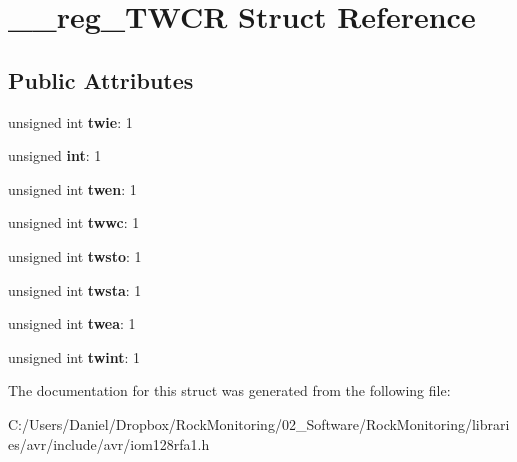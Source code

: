 \hypertarget{struct____reg___t_w_c_r}{}\section{\+\_\+\+\_\+reg\+\_\+\+T\+W\+CR Struct Reference}
\label{struct____reg___t_w_c_r}
\subsection*{Public Attributes}
\begin{DoxyCompactItemize}
\item 
unsigned int {\bfseries twie}\+: 1\hypertarget{struct____reg___t_w_c_r_a1f4dfd77061f0fb4a3e2cc3dc9882371}{}\label{struct____reg___t_w_c_r_a1f4dfd77061f0fb4a3e2cc3dc9882371}

\item 
unsigned {\bfseries int}\+: 1\hypertarget{struct____reg___t_w_c_r_a723570c3f1619cb053e5e4f7cf4b173a}{}\label{struct____reg___t_w_c_r_a723570c3f1619cb053e5e4f7cf4b173a}

\item 
unsigned int {\bfseries twen}\+: 1\hypertarget{struct____reg___t_w_c_r_a10d55926da76d4ef8523a8f0936f0f5e}{}\label{struct____reg___t_w_c_r_a10d55926da76d4ef8523a8f0936f0f5e}

\item 
unsigned int {\bfseries twwc}\+: 1\hypertarget{struct____reg___t_w_c_r_a28370e74a0cd4af87878f923caf95e13}{}\label{struct____reg___t_w_c_r_a28370e74a0cd4af87878f923caf95e13}

\item 
unsigned int {\bfseries twsto}\+: 1\hypertarget{struct____reg___t_w_c_r_a2b13db146f6d5e5ede25d5751b9d6c9b}{}\label{struct____reg___t_w_c_r_a2b13db146f6d5e5ede25d5751b9d6c9b}

\item 
unsigned int {\bfseries twsta}\+: 1\hypertarget{struct____reg___t_w_c_r_a7cfbc701de32748b2295dfd4dd0fe133}{}\label{struct____reg___t_w_c_r_a7cfbc701de32748b2295dfd4dd0fe133}

\item 
unsigned int {\bfseries twea}\+: 1\hypertarget{struct____reg___t_w_c_r_a90294b585066bb05f3b5bb996fd8bfd9}{}\label{struct____reg___t_w_c_r_a90294b585066bb05f3b5bb996fd8bfd9}

\item 
unsigned int {\bfseries twint}\+: 1\hypertarget{struct____reg___t_w_c_r_a6d861790b7ca7ca772589b41e8410f9a}{}\label{struct____reg___t_w_c_r_a6d861790b7ca7ca772589b41e8410f9a}

\end{DoxyCompactItemize}


The documentation for this struct was generated from the following file\+:\begin{DoxyCompactItemize}
\item 
C\+:/\+Users/\+Daniel/\+Dropbox/\+Rock\+Monitoring/02\+\_\+\+Software/\+Rock\+Monitoring/libraries/avr/include/avr/iom128rfa1.\+h\end{DoxyCompactItemize}
